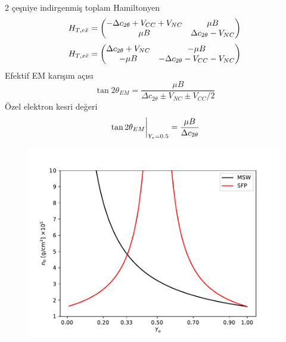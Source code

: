 \documentclass[10pt]{beamer}
\begin{document}
\begin{frame}[noframenumbering]
    \begin{minipage}{0.45\textwidth}
        \footnotesize
        2 çeşniye indirgenmiş toplam Hamiltonyen
        \tiny
        \begin{equation*}
            H_{T,e\bar{x}} = \mqty(-\Delta c_{2\theta}+V_{CC}+V_{NC} & \mu B \\ \mu B & \Delta c_{2\theta}-V_{NC})
        \end{equation*}
        \begin{equation*}
	        H_{T,x\bar{e}} = \mqty(\Delta c_{2\theta}+V_{NC} & -\mu B \\ -\mu B & -\Delta c_{2\theta}-V_{CC}-V_{NC})
        \end{equation*}
        \footnotesize
        Efektif EM karışım açısı
        \begin{equation*}
            \tan 2\theta_{EM} = \frac{\mu B}{\Delta c_{2\theta} \pm V_{NC} \pm V_{CC}/2}
        \end{equation*}
        Özel elektron kesri değeri
        \begin{equation*}
            \eval{\tan 2\theta_{EM}}_{Y_{e}=0.5} = \frac{\mu B}{\Delta c_{2\theta}}
        \end{equation*}
        \normalsize
    \end{minipage}
    \hfill
    \begin{minipage}{0.45\textwidth}
        \begin{figure}[hbt!]
            \centering
            \includegraphics[width=1.2\textwidth]{fig/resonance_nb_Ye.pdf}
        \end{figure}
    \end{minipage}
\end{frame}
\end{document}
